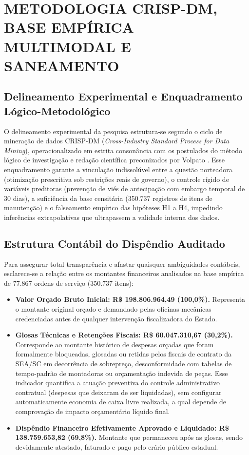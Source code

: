 \chapter{METODOLOGIA CRISP-DM, BASE EMPÍRICA MULTIMODAL E SANEAMENTO}
\label{cap:metodologia}

\section{Delineamento Experimental e Enquadramento Lógico-Metodológico}

O delineamento experimental da pesquisa estrutura-se segundo o ciclo de mineração de dados CRISP-DM (\textit{Cross-Industry Standard Process for Data Mining}), operacionalizado em estrita consonância com os postulados do método lógico de investigação e redação científica preconizados por Volpato \cite{volpato2015}. Esse enquadramento garante a vinculação indissolúvel entre a questão norteadora (otimização prescritiva sob restrições reais de governo), o controle rígido de variáveis preditoras (prevenção de viés de antecipação com embargo temporal de 30 dias), a suficiência da base censitária (350.737 registros de itens de manutenção) e o falseamento empírico das hipóteses H1 a H4, impedindo inferências extrapolativas que ultrapassem a validade interna dos dados.

\section{Estrutura Contábil do Dispêndio Auditado}

Para assegurar total transparência e afastar quaisquer ambiguidades contábeis, esclarece-se a relação entre os montantes financeiros analisados na base empírica de 77.867 ordens de serviço (350.737 itens):
\begin{itemize}
    \item \textbf{Valor Orçado Bruto Inicial: R\$ 198.806.964,49 (100,0\%).} Representa o montante original orçado e demandado pelas oficinas mecânicas credenciadas antes de qualquer intervenção fiscalizadora do Estado.
    \item \textbf{Glosas Técnicas e Retenções Fiscais: R\$ 60.047.310,67 (30,2\%).} Corresponde ao montante histórico de despesas orçadas que foram formalmente bloqueadas, glosadas ou retidas pelos fiscais de contrato da SEA/SC em decorrência de sobrepreço, desconformidade com tabelas de tempo-padrão de montadoras ou orçamentação indevida de peças. Esse indicador quantifica a atuação preventiva do controle administrativo contratual (despesas que deixaram de ser liquidadas), sem configurar automaticamente economia de caixa livre realizada, a qual depende de comprovação de impacto orçamentário líquido final.
    \item \textbf{Dispêndio Financeiro Efetivamente Aprovado e Liquidado: R\$ 138.759.653,82 (69,8\%).} Montante que permaneceu após as glosas, sendo devidamente atestado, faturado e pago pelo erário público estadual.
\end{itemize}


